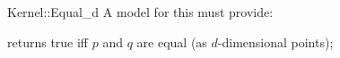\begin{ccRefFunctionObjectConcept}{Kernel::Equal_d}
A model for this must provide:


{returns true iff $p$ and $q$ are equal (as $d$-dimensional points);}

\end{ccRefFunctionObjectConcept}
